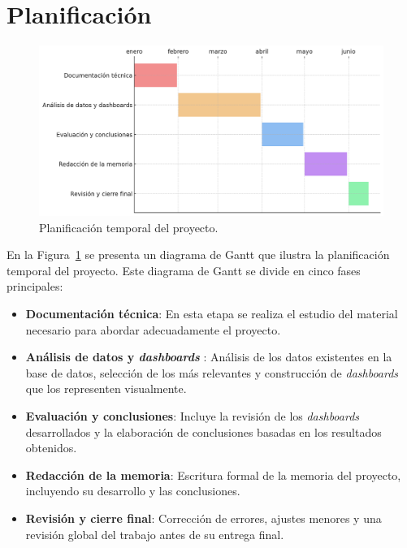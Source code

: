 \documentclass[a4paper, 12pt]{book}
\begin{document}
\section{Planificación}
\label{sec:objetivos}

\begin{figure}[H]
    \centering
    \includegraphics[width=\textwidth]{img/gant.png}
    \caption{Planificación temporal del proyecto.}
    \label{fig:planificacion}
\end{figure}

En la Figura~\ref{fig:planificacion} se presenta un diagrama de Gantt que ilustra la planificación temporal del proyecto. Este diagrama de Gantt se divide en cinco fases principales:

\begin{itemize}
    \item \textbf{Documentación técnica}: En esta etapa se realiza el estudio del material necesario para abordar adecuadamente el proyecto.
    \item \textbf{Análisis de datos y \textit{dashboards} }: Análisis de los datos existentes en la base de datos, selección de los más relevantes y construcción de \textit{dashboards} que los representen visualmente.
    \item \textbf{Evaluación y conclusiones}: Incluye la revisión de los \textit{dashboards} desarrollados y la elaboración de conclusiones basadas en los resultados obtenidos.
    \item \textbf{Redacción de la memoria}: Escritura formal de la memoria del proyecto, incluyendo su desarrollo y las conclusiones.
    \item \textbf{Revisión y cierre final}: Corrección de errores, ajustes menores y una revisión global del trabajo antes de su entrega final.
\end{itemize}
\end{document}
